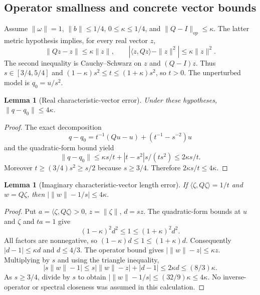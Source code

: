 \documentclass[11pt]{article}
\newtheorem{lemma}[theorem]{Lemma}
\theoremstyle{definition}
\theoremstyle{remark}
\numberwithin{equation}{section}
\begin{document}
\subsection{Operator smallness and concrete vector bounds}\label{metric-characteristic:operator}\label{metric-characteristic:inverse}\label{metric-characteristic:vectors}\label{metric-characteristic:residual}\label{metric-characteristic:hessian}
Assume $\|\omega\|=1$, $\|b\|\le1/4$, $0\le\kappa\le1/4$, and
$\|Q-I\|_{op}\le\kappa$. The latter metric hypothesis implies, for every
real vector $z$,
\[
 \|Qz-z\|\le\kappa\|z\|,\qquad
 |\langle z,Qz\rangle-\|z\|^2|\le\kappa\|z\|^2.
\]
The second inequality is Cauchy--Schwarz on $z$ and $(Q-I)z$.
Thus $s\in[3/4,5/4]$ and
$(1-\kappa)s^2\le t\le(1+\kappa)s^2$, so $t>0$.
The unperturbed model is $q_0=u/s^2$.

\begin{lemma}[Real characteristic-vector error]
Under these hypotheses,
$\|q-q_0\|\le4\kappa$.
\end{lemma}
\begin{proof}
The exact decomposition
\[
 q-q_0=t^{-1}(Qu-u)+(t^{-1}-s^{-2})u
\]
and the quadratic-form bound yield
\[
 \|q-q_0\|\le\kappa s/t+|t-s^2|s/(ts^2)
                 \le2\kappa s/t.
\]
Moreover $t\ge(3/4)s^2\ge s/2$ because $s\ge3/4$.
Therefore $2\kappa s/t\le4\kappa$.
\end{proof}

\begin{lemma}[Imaginary characteristic-vector length error]
If $\langle\zeta,Q\zeta\rangle=1/t$ and $w=Q\zeta$, then
$|\|w\|-1/s|\le4\kappa$.
\end{lemma}
\begin{proof}
Put $a=\langle\zeta,Q\zeta\rangle>0$, $z=\|\zeta\|$, $d=sz$.
The quadratic-form bounds at $u$ and $\zeta$ and $ta=1$ give
\[
 (1-\kappa)^2d^2\le1\le(1+\kappa)^2d^2.
\]
All factors are nonnegative, so
$(1-\kappa)d\le1\le(1+\kappa)d$.
Consequently $|d-1|\le\kappa d$ and $d\le4/3$.
The operator bound gives $|\|w\|-z|\le\kappa z$.
Multiplying by $s$ and using the triangle inequality,
\[
 |s\|w\|-1|\le s|\|w\|-z|+|d-1|
             \le2\kappa d\le(8/3)\kappa.
\]
As $s\ge3/4$, divide by $s$ to obtain
$|\|w\|-1/s|\le(32/9)\kappa\le4\kappa$.
No inverse-operator or spectral closeness was assumed in this calculation.
\end{proof}
\end{document}
